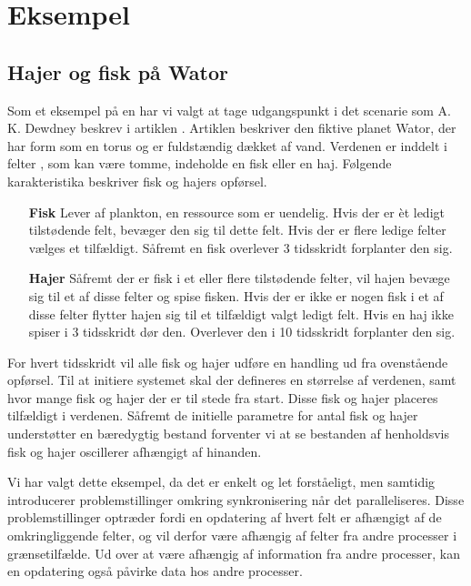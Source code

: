 \section{Eksempel}


\subsection{Hajer og fisk på Wator} Som et eksempel på en \des har vi valgt at 
tage  udgangspunkt i det scenarie som A. K. Dewdney
beskrev i artiklen \cite{wator}. Artiklen beskriver den
fiktive planet Wator, der har form som en torus og er fuldstændig
dækket af vand. Verdenen er inddelt i felter \cite[20]{wator}, som kan være tomme, indeholde en
fisk eller en haj. Følgende karakteristika beskriver fisk og hajers
opførsel.

\begin{itemize}
\item[\textbf{Fisk}]
Lever af plankton, en ressource som er uendelig. Hvis der er èt ledigt 
tilstødende felt, bevæger den sig til dette felt. Hvis der er flere ledige 
felter vælges et tilfældigt. Såfremt en fisk overlever 3 tidsskridt forplanter 
den sig.
\item[\textbf{Hajer}]
Såfremt der er fisk i et eller flere tilstødende felter, vil hajen bevæge sig 
til et af disse felter og spise fisken. Hvis der er ikke er nogen fisk i et af 
disse felter flytter hajen sig til et tilfældigt valgt ledigt felt. Hvis en haj 
ikke spiser i 3 tidsskridt dør den. Overlever den i 10 tidsskridt forplanter 
den sig.
\end{itemize}

For hvert tidsskridt vil alle fisk og hajer udføre en handling ud fra
ovenstående opførsel.
Til at initiere systemet skal der defineres en størrelse af verdenen,
samt hvor mange fisk og hajer der er til stede fra start. Disse fisk og
hajer placeres tilfældigt i verdenen.
Såfremt de initielle parametre for antal fisk og hajer understøtter en 
bæredygtig bestand forventer vi at se bestanden af henholdsvis fisk og hajer 
oscillerer afhængigt af hinanden.

Vi har valgt dette eksempel, da det er enkelt og let forståeligt, men samtidig 
introducerer problemstillinger omkring synkronisering når det paralleliseres.  
Disse problemstillinger optræder fordi en opdatering af hvert felt er afhængigt 
af de omkringliggende felter, og vil derfor være afhængig af felter fra andre 
processer i grænsetilfælde. Ud over at være afhængig af information fra andre 
processer, kan en opdatering også påvirke data hos andre processer.   

